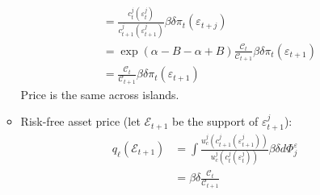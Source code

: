 \documentclass{article}
\begin{document}
\begin{enumerate}
\begin{itemize}
\begin{align*}
&= \frac{c_t^j(\varepsilon_t^j)}{c_{t+1}^j(\varepsilon_{t+1}^j)} \beta \delta \pi_t(\varepsilon_{t+j})\\
&= \exp(\alpha - B -\alpha + B) \frac{\mathcal{C}_t}{\mathcal{C}_{t+1}} \beta \delta \pi_t(\varepsilon_{t+1})\\
&= \frac{\mathcal{C}_t}{\mathcal{C}_{t+1}} \beta \delta \pi_t(\varepsilon_{t+1})
\end{align*}
Price is the same across islands.
\item Risk-free asset price (let $\mathcal{E}_{t+1}$ be the support of $\varepsilon_{t+1}^j$):
\begin{align*}
q_\ell(\mathcal{E}_{t+1}) 
&= \int \frac{u_c^j(c_{t+1}^j(\varepsilon_{t+1}^j))}{u_c^j(c_{t}^j(\varepsilon_{t}^j))} \beta \delta d \Phi_j^\varepsilon\\
&= \beta \delta \frac{\mathcal{C}_t}{\mathcal{C}_{t+1}}
\end{align*}


\end{itemize}
\end{enumerate}
\end{document}
